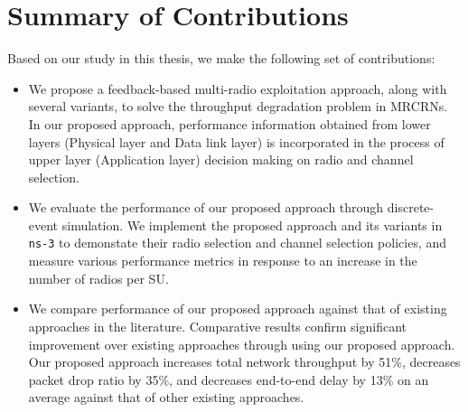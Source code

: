 
\section{Summary of Contributions}

Based on our study in this thesis, we make the following set of contributions:

\begin{itemize}
\item We propose a feedback-based multi-radio exploitation approach, along with several variants, to solve the throughput degradation problem in MRCRNs. In our proposed approach, performance information obtained from lower layers (Physical layer and Data link layer) is incorporated in the process of upper layer (Application layer) decision making on radio and channel selection.
\item We evaluate the performance of our proposed approach through discrete-event simulation. We implement the proposed approach and its variants in \texttt{ns-3} to demonstate their radio selection and channel selection policies, and measure various performance metrics in response to an increase in the number of radios per SU.
\item We compare performance of our proposed approach against that of existing approaches in the literature. Comparative results confirm significant improvement over existing approaches through using our proposed approach. Our proposed approach increases total network throughput by 51\%, decreases packet drop ratio by 35\%, and decreases end-to-end delay by 13\% on an average against that of other existing approaches.
\end{itemize}
\endinput
